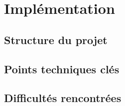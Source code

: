 \section{Implémentation}
\label{sec:implementation}

\subsection{Structure du projet}

\subsection{Points techniques clés}


\subsection{Difficultés rencontrées}
